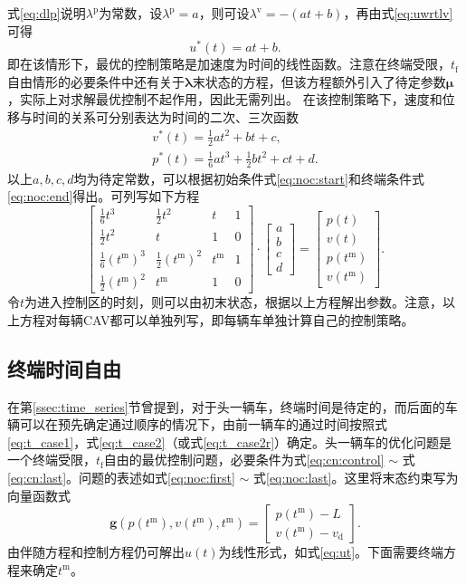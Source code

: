 式\eqref{eq:dlp}说明$\lambda^\mathrm{p}$为常数，设$\lambda^\mathrm{p}=a$，则可设$\lambda^\mathrm{v}=-(at+b)$，再由式\eqref{eq:uwrtlv}可得
\begin{equation}
u^*(t)=at+b.
\label{eq:ut}
\end{equation}
即在该情形下，最优的控制策略是加速度为时间的线性函数。注意在终端受限，$t_\mathrm{f}$自由情形的必要条件中还有关于$\bm{\lambda}$末状态的方程，但该方程额外引入了待定参数$\bm{\mu}$，实际上对求解最优控制不起作用，因此无需列出。
在该控制策略下，速度和位移与时间的关系可分别表达为时间的二次、三次函数
\begin{gather}
v^*(t)=\frac12at^2+bt+c,\\
p^*(t)=\frac16at^3+\frac12bt^2+ct+d.
\end{gather}
以上$a,b,c,d$均为待定常数，可以根据初始条件式\eqref{eq:noc:start}和终端条件式\eqref{eq:noc:end}得出。可列写如下方程
\begin{equation}
\begin{bmatrix}
\frac16t^3 & \frac12t^2 & t & 1 \\
\frac12t^2 & t & 1 & 0 \\
\frac16(t^\mathrm{m})^3 & \frac12(t^\mathrm{m})^2 & t^\mathrm{m} & 1 \\
\frac12(t^\mathrm{m})^2 & t^\mathrm{m} & 1 & 0
\end{bmatrix}\cdot
\begin{bmatrix}
a\\b\\c\\d
\end{bmatrix}
 = \begin{bmatrix}
p(t)\\v(t)\\p(t^\mathrm{m})\\v(t^\mathrm{m})
\end{bmatrix}.
\label{eq:noc:array}
\end{equation}
令$t$为进入控制区的时刻，则可以由初末状态，根据以上方程解出参数。注意，以上方程对每辆CAV都可以单独列写，即每辆车单独计算自己的控制策略。

\subsection{终端时间自由}
\label{ssec:freetf}
在第\ref{ssec:time_series}节曾提到，对于头一辆车，终端时间是待定的，而后面的车辆可以在预先确定通过顺序的情况下，由前一辆车的通过时间按照式\eqref{eq:t_case1}，式\eqref{eq:t_case2}（或式\eqref{eq:t_case2r}）确定。头一辆车的优化问题是一个终端受限，$t_\mathrm{f}$自由的最优控制问题，必要条件为式\eqref{eq:cn:control} $\sim$ 式\eqref{eq:cn:last}。问题的表述如式\eqref{eq:noc:first} $\sim$ 式\eqref{eq:noc:last}。这里将末态约束写为向量函数式
\begin{equation}
\bm{g}(p(t^\mathrm{m}),v(t^\mathrm{m}),t^\mathrm{m})=
\begin{bmatrix}
p(t^\mathrm{m})-L\\
v(t^\mathrm{m})-v_\mathrm{d}
\end{bmatrix}.
\end{equation}
由伴随方程和控制方程仍可解出$u(t)$为线性形式，如式\eqref{eq:ut}。下面需要终端方程来确定$t^\mathrm{m}$。


